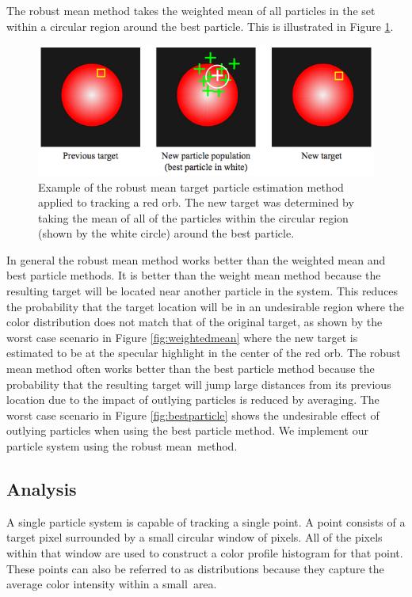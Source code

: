 \documentclass[11pt]{article}
\begin{document}
The robust mean method takes the weighted mean of all particles in the set within a circular region around the best particle. This is illustrated in Figure \ref{fig:robustmean}.

\begin{figure}[H]
\centering
\includegraphics[scale=.55]{img/robustmean.jpg}
\caption{Example of the robust mean target particle estimation method applied to tracking a red orb. The new target was determined by taking the mean of all of the particles within the circular region (shown by the white circle) around the best particle.}
\label{fig:robustmean}
\end{figure}

In general the robust mean method works better than the weighted mean and best particle methods. It is better than the weight mean method because the resulting target will be located near another particle in the system. This reduces the probability that the target location will be in an undesirable region where the color distribution does not match that of the original target, as shown by the worst case scenario in Figure \ref{fig:weightedmean} where the new target is estimated to be at the specular highlight in the center of the red orb. The robust mean method often works better than the best particle method because the probability that the resulting target will jump large distances from its previous location due to the impact of outlying particles is reduced by averaging. The worst case scenario in Figure \ref{fig:bestparticle} shows the undesirable effect of outlying particles when using the best particle method. We implement our particle system using the robust mean~method.



\subsection{Analysis}

A single particle system is capable of tracking a single point. A point consists of a target pixel surrounded by a small circular window of pixels. All of the pixels within that window are used to construct a color profile histogram for that point. These points can also be referred to as distributions because they capture the average color intensity within a small~area.
\end{document}
